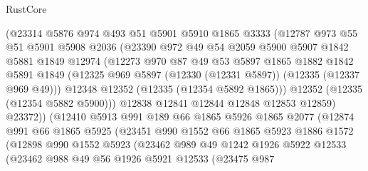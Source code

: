 \begin{lexlean}{RustCore}
\begin{coremodule}
                (@23314
                  @5876
                  @974
                  @493
                  @51
                  @5901
                  @5910
                  @1865
                  @3333
                  (@12787
                    @973
                    @55
                    @51
                    @5901
                    @5908
                    @2036
                    (@23390
                      @972
                      @49
                      @54
                      @2059
                      @5900
                      @5907
                      @1842
                      @5881
                      @1849
                      @12974
                      (@12273
                        @970
                        @87
                        @49
                        @53
                        @5897
                        @1865
                        @1882
                        @1842
                        @5891
                        @1849
                        (@12325 @969 @5897 (@12330 (@12331 @5897)) (@12335 (@12337 @969 @49)))
                        @12348
                        @12352
                        (@12335 (@12354 @5892 @1865)))
                      @12352
                      (@12335 (@12354 @5882 @5900)))
                    @12838
                    @12841
                    @12844
                    @12848
                    @12853
                    @12859)
                  @23372))
              (@12410
                @5913
                @991
                @189
                @66
                @1865
                @5926
                @1865
                @2077
                (@12874
                  @991
                  @66
                  @1865
                  @5925
                  (@23451
                    @990
                    @1552
                    @66
                    @1865
                    @5923
                    @1886
                    @1572
                    (@12898
                      @990
                      @1552
                      @5923
                      (@23462
                        @989
                        @49
                        @1242
                        @1926
                        @5922
                        @12533
                        (@23462
                          @988
                          @49
                          @56
                          @1926
                          @5921
                          @12533
                          (@23475
                            @987

\end{coremodule}
\end{lexlean}
